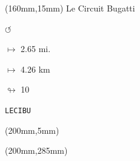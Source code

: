 \begin{textblock*}{40mm}(160mm,15mm)%
Le Circuit Bugatti
\par \Huge$\circlearrowleft$
\Large
\par$\mapsto$ 2.65 mi.
\par$\mapsto$ 4.26 km
\par$\looparrowright$ 10
\par\hfill\tiny\tt LECIBU\\
\end{textblock*}
\begin{textblock*}{20mm}(200mm,5mm)%
\fbox{\thepage}
\end{textblock*}
\begin{textblock*}{20mm}(200mm,285mm)%
\fbox{\thepage}
\end{textblock*}
\null\newpage

